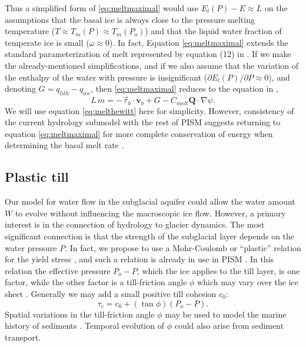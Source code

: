 \documentclass[11pt]{amsart}
\newcommand{\bv}{\mathbf{v}}
\newcommand{\Cmelt}{C_{melt}}
\begin{document}
Thus a simplified form of \eqref{eq:meltmaximal} would use $E_l(P) - E \approx L$ on the assumptions that the basal ice is always close to the pressure melting temperature ($T\approx T_m(P) \approx T_m(P_o)$) and that the liquid water fraction of temperate ice is small ($\omega \approx 0$).  In fact, Equation \eqref{eq:meltmaximal} extends the standard parameterization of melt represented by equation (12) in \citet{Hewitt2011}.  If we make the already-mentioned simplifications, and if we also assume that the variation of the enthalpy of the water with pressure is insignificant ($\partial E_l(P)/\partial P \approx 0$), and denoting $G=q_{lith} - q_{ice}$, then \eqref{eq:meltmaximal} reduces to the equation in \citet{Hewitt2011},
\begin{equation}\label{eq:melthewitt}
L\, m = -\vec \tau_b\cdot \bv_b + G - \Cmelt \mathbf{Q} \cdot \nabla \psi.
\end{equation}
We will use equation \eqref{eq:melthewitt} here for simplicity.  However, consistency of the current hydrology submodel with the rest of PISM suggests returning to equation \eqref{eq:meltmaximal} for more complete conservation of energy when determining the basal melt rate \citep{AschwandenBuelerKhroulevBlatter}.


\subsection*{Plastic till}  Our model for water flow in the subglacial aquifer could allow the water amount $W$ to evolve without influencing the macroscopic ice flow.  However, a primary interest is in the connection of hydrology to glacier dynamics.  The most significant connection is that the strength of the subglacial layer depends on the water pressure $P$.  In fact, we propose to use a Mohr-Coulomb or ``plastic'' relation for the yield stress \citep{Clarke05, SchoofStream, SchoofTill}, and such a relation is already in  use in PISM \citep{BBssasliding,Winkelmannetal2011}.  In this relation the effective pressure $P_o - P$, which the ice applies to the till layer, is one factor, while the other factor is a till-friction angle $\phi$ which may vary over the ice sheet \citep{BBssasliding}.  Generally we may add a small positive till cohesion $c_0$:
\begin{equation} \label{eq:mohr-coulomb}
  \tau_c = c_0 + (\tan{\phi}) (P_o - P).
\end{equation}
Spatial variations in the till-friction angle $\phi$ may be used to model the marine history of sediments \citep[e.g.][]{Martinetal2011}.  Temporal evolution of $\phi$ could also arise from sediment transport.
\end{document}
